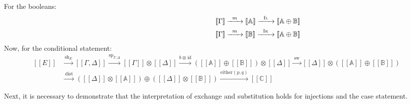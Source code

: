 For the booleans: 
\begin{equation} \label{eq:proof_bool}
 \begin{aligned} 
    \hspace{120pt}&  [\![\Gamma ]\!]   \xrightarrow{\hspace{5pt}m\hspace{5pt}} [\![\mathbb{A} ]\!] \xrightarrow{\hspace{6pt}\textsc{Il}\hspace{6pt}} [\![\mathbb{A} \oplus \mathbb{B}]\!] \\ 
     &[\![\Gamma ]\!]   \xrightarrow{\hspace{5pt}m\hspace{5pt}} [\![\mathbb{B} ]\!] \xrightarrow{\hspace{6pt}\textsc{Ir}\hspace{6pt}} [\![\mathbb{A} \oplus \mathbb{B}]\!]
\end{aligned}   
\end{equation}
Now, for the conditional statement:
\begin{equation} \label{eq:proof_bool_2}
 \begin{aligned} 
    [\![E]\!] & \xrightarrow{\hspace{2pt}\text{sh}_{E}\hspace{2pt}}   [\![\Gamma,\Delta ]\!]   \xrightarrow{\hspace{1pt}\text{sp}_{\Gamma;\Delta}\hspace{1pt}}  [\![\Gamma ]\!] \otimes [\![\Delta ]\!] \xrightarrow{ b \hspace{1pt} \otimes \hspace{1pt} \text{id}} ([\![\mathbb{A} ]\!] \oplus [\![\mathbb{B} ]\!]) \otimes [\![\Delta ]\!] \xrightarrow{\hspace{2pt}\text{sw}\hspace{2pt}}  [\![\Delta ]\!] \otimes ([\![\mathbb{A} ]\!] \oplus [\![\mathbb{B} ]\!])  \\
    & \xrightarrow{\hspace{3pt}\text{dist}\hspace{3pt}} ([\![\Delta ]\!] \otimes [\![\mathbb{A} ]\!]  ) \oplus (  [\![\Delta ]\!] \otimes [\![\mathbb{B} ]\!] ) \xrightarrow{\hspace{1pt}\text{either}(p,q)\hspace{1pt}} [\![\mathbb{C} ]\!]
\end{aligned}   
\end{equation}


Next, it is necessary to demonstrate that the interpretation of exchange and substitution holds for injections and the case statement.

